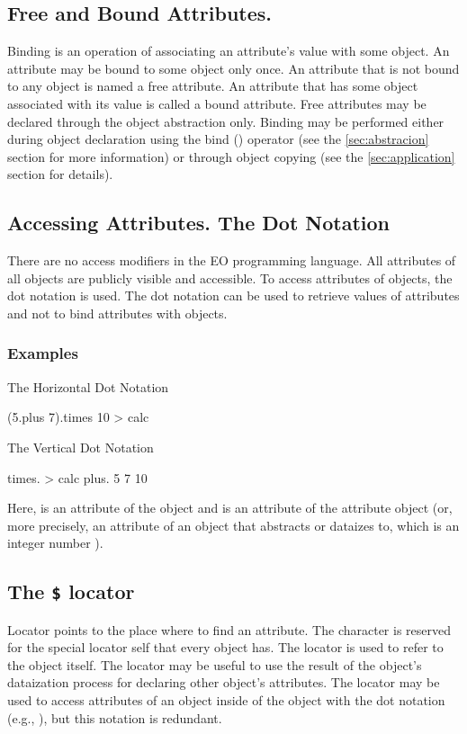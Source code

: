 \documentclass[12pt]{book}
\begin{document}
\subsection{Free and Bound Attributes.} \label{subsec:free-bound-attr}
Binding is an operation of associating an attribute's value with some object. An attribute may be bound to some object only once.
An attribute that is not bound to any object is named a free attribute. An attribute that has some object associated with its value is called a bound attribute.
Free attributes may be declared through the object abstraction only. Binding may be performed either during object declaration using the bind (\ff{>}) operator (see the \ref{sec:abstracion} section for more information) or through object copying (see the \ref{sec:application} section for details).

\subsection{Accessing Attributes. The Dot Notation}
There are no access modifiers in the EO programming language. All attributes of all objects are publicly visible and accessible. To access attributes of objects, the dot notation is used. The dot notation can be used to retrieve values of attributes and not to bind attributes with objects.

\subsubsection{Examples}

The Horizontal Dot Notation
\begin{ffcode}
(5.plus 7).times 10 > calc
\end{ffcode}
The Vertical Dot Notation
\begin{ffcode}
times. > calc
  plus.
    5
    7
  10
\end{ffcode}

Here,  is an attribute of the object  and  is an attribute of the attribute object  (or, more precisely, an attribute of an object that  abstracts or dataizes to, which is an integer number ).

\subsection{The \texttt{\$} locator}
Locator points to the place where to find an attribute. The \ff{$} character is reserved for the special locator self that every object has. The \ff{$} locator is used to refer to the object itself.
The \ff{$} locator may be useful to use the result of the object's dataization process for declaring other object's attributes.
The \ff{$} locator may be used to access attributes of an object inside of the object with the dot notation (e.g., ), but this notation is redundant.
\end{document}
